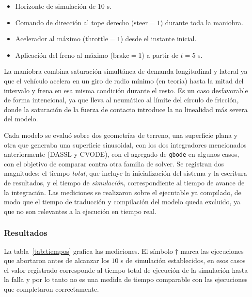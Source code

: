 \begin{itemize}
    \item Horizonte de simulación de $10$ s.
    \item Comando de dirección al tope derecho ($\text{steer} = 1$) durante toda la maniobra.
    \item Acelerador al máximo ($\text{throttle} = 1$) desde el instante inicial.
    \item Aplicación del freno al máximo ($\text{brake} = 1$) a partir de $t = 5$ s.
\end{itemize}

La maniobra combina saturación simultánea de demanda longitudinal y lateral ya que el vehículo acelera en un giro de radio mínimo (en teoría) hasta la mitad del intervalo y frena en esa misma condición durante el resto. Es un caso desfavorable de forma intencional, ya que lleva al neumático al límite del círculo de fricción, donde la saturación de la fuerza de contacto introduce la no linealidad más severa del modelo.

Cada modelo se evaluó sobre dos geometrías de terreno, una superficie plana y otra que generaba una superficie sinusoidal, con los dos integradores mencionados anteriormente (DASSL y CVODE), con el agregado de \verb|gbode| en algunos casos, con el objetivo de comparar contra otra familia de solver. Se registran dos magnitudes: el tiempo \textit{total}, que incluye la inicialización del sistema y la escritura de resultados, y el tiempo de \textit{simulación}, correspondiente al tiempo de avance de la integración.  Las mediciones se realizaron sobre el ejecutable ya compilado, de modo que el tiempo de traducción y compilación del modelo queda excluido, ya que no son relevantes a la ejecución en tiempo real.

\subsubsection{Resultados}

La tabla~\ref{tab:tiempos} grafica las mediciones. El símbolo $\dagger$ marca las ejecuciones que abortaron antes de alcanzar los $10$ s de simulación establecidos, en esos casos el valor registrado corresponde al tiempo total de ejecución de la simulación hasta la falla y por lo tanto no es una medida de tiempo comparable con las ejecuciones que completaron correctamente.


